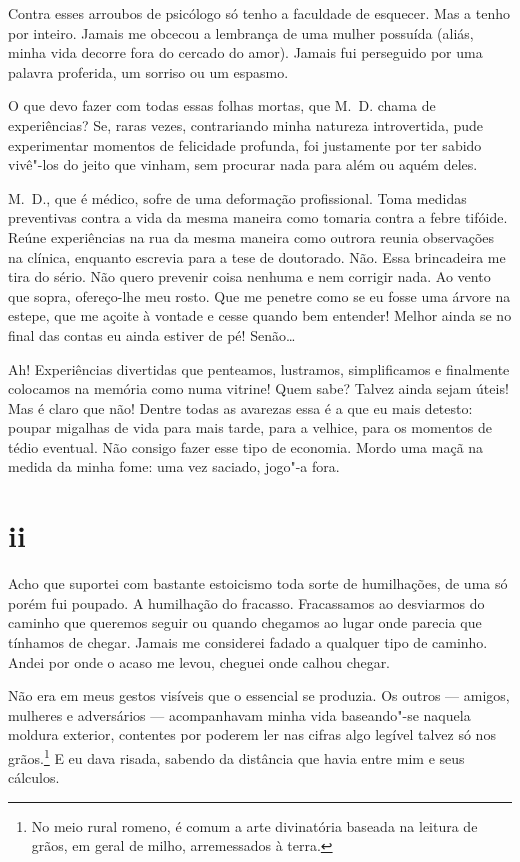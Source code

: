 Contra esses arroubos de psicólogo só tenho a faculdade de esquecer. Mas
a tenho por inteiro. Jamais me obcecou a lembrança de uma mulher
possuída (aliás, minha vida decorre fora do cercado do amor).
Jamais fui perseguido por uma palavra proferida, um sorriso ou
um espasmo.

O que devo fazer com todas essas folhas mortas, que M.~D. chama de
experiências? Se, raras vezes, contrariando minha natureza
introvertida, pude experimentar momentos de felicidade profunda, foi
justamente por ter sabido vivê"-los do jeito que vinham, sem procurar
nada para além ou aquém deles.

M.~D., que é médico, sofre de uma deformação profissional. Toma medidas
preventivas contra a vida da mesma maneira como tomaria contra a febre
tifóide. Reúne experiências na rua da mesma maneira como outrora reunia
observações na clínica, enquanto escrevia para a tese de doutorado. Não.
Essa brincadeira me tira do sério. Não quero prevenir coisa nenhuma e
nem corrigir nada. Ao vento que sopra, ofereço-lhe meu rosto.
Que me penetre como se eu fosse uma árvore na estepe, que me açoite à
vontade e cesse quando bem entender! Melhor ainda se no final das
contas eu ainda estiver de pé! Senão\ldots{}

Ah! Experiências divertidas que penteamos, lustramos, simplificamos e
finalmente colocamos na memória como numa vitrine! Quem sabe? Talvez
ainda sejam úteis! Mas é claro que não! Dentre
todas as avarezas essa é a que eu mais detesto: poupar migalhas de vida
para mais tarde, para a velhice, para os momentos de tédio eventual. Não
consigo fazer esse tipo de economia. Mordo uma maçã na medida da minha
fome: uma vez saciado, jogo"-a fora.

\section{ii}

Acho que suportei com bastante estoicismo toda sorte de humilhações, de
uma só porém fui poupado. A humilhação do fracasso. Fracassamos ao
desviarmos do caminho que queremos seguir ou quando chegamos ao lugar
onde parecia que tínhamos de chegar. Jamais me considerei
fadado a qualquer tipo de caminho. Andei por onde o acaso me levou,
cheguei onde calhou chegar.

Não era em meus gestos visíveis que o essencial se produzia. Os outros ---
amigos, mulheres e adversários --- acompanhavam minha vida baseando"-se
naquela moldura exterior, contentes por poderem ler nas cifras algo
legível talvez só nos grãos.\footnote{No meio
rural romeno, é comum a arte divinatória baseada na leitura de grãos, em
geral de milho, arremessados à terra.} E eu dava risada, sabendo da distância
que havia entre mim e seus cálculos.

